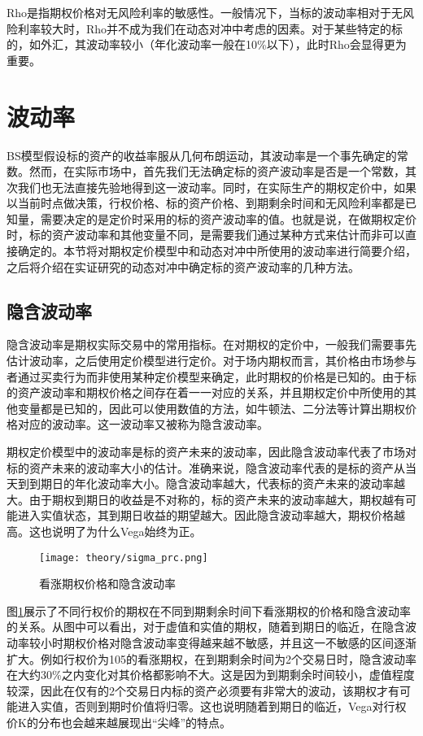 Rho是指期权价格对无风险利率的敏感性。一般情况下，当标的波动率相对于无风险利率较大时，Rho并不成为我们在动态对冲中考虑的因素。对于某些特定的标的，如外汇，其波动率较小（年化波动率一般在10\%以下），此时Rho会显得更为重要。

\section{波动率}

BS模型假设标的资产的收益率服从几何布朗运动，其波动率是一个事先确定的常数。然而，在实际市场中，首先我们无法确定标的资产波动率是否是一个常数，其次我们也无法直接先验地得到这一波动率。同时，在实际生产的期权定价中，如果以当前时点做决策，行权价格、标的资产价格、到期剩余时间和无风险利率都是已知量，需要决定的是定价时采用的标的资产波动率的值。也就是说，在做期权定价时，标的资产波动率和其他变量不同，是需要我们通过某种方式来估计而非可以直接确定的。本节将对期权定价模型中和动态对冲中所使用的波动率进行简要介绍，之后将介绍在实证研究的动态对冲中确定标的资产波动率的几种方法。

\subsection{隐含波动率}

隐含波动率是期权实际交易中的常用指标。在对期权的定价中，一般我们需要事先估计波动率，之后使用定价模型进行定价。对于场内期权而言，其价格由市场参与者通过买卖行为而非使用某种定价模型来确定，此时期权的价格是已知的。由于标的资产波动率和期权价格之间存在着一一对应的关系，并且期权定价中所使用的其他变量都是已知的，因此可以使用数值的方法，如牛顿法、二分法等计算出期权价格对应的波动率。这一波动率又被称为隐含波动率。

期权定价模型中的波动率是标的资产未来的波动率，因此隐含波动率代表了市场对标的资产未来的波动率大小的估计。准确来说，隐含波动率代表的是标的资产从当天到到期日的年化波动率大小。隐含波动率越大，代表标的资产未来的波动率越大。由于期权到期日的收益是不对称的，标的资产未来的波动率越大，期权越有可能进入实值状态，其到期日收益的期望越大。因此隐含波动率越大，期权价格越高。这也说明了为什么Vega始终为正。

\begin{figure}[htb]
  \centering
  \texttt{[image: theory/sigma\_prc.png]}
  \caption[这里将出现在插图索引中]
    {看涨期权价格和隐含波动率}
  \label{fig:sigma_prc}
\end{figure}

图\ref{fig:sigma_prc}展示了不同行权价的期权在不同到期剩余时间下看涨期权的价格和隐含波动率的关系。从图中可以看出，对于虚值和实值的期权，随着到期日的临近，在隐含波动率较小时期权价格对隐含波动率变得越来越不敏感，并且这一不敏感的区间逐渐扩大。例如行权价为105的看涨期权，在到期剩余时间为2个交易日时，隐含波动率在大约30\%之内变化对其价格都影响不大。这是因为到期剩余时间较小，虚值程度较深，因此在仅有的2个交易日内标的资产必须要有非常大的波动，该期权才有可能进入实值，否则到期时价值将归零。这也说明随着到期日的临近，Vega对行权价K的分布也会越来越展现出“尖峰”的特点。

